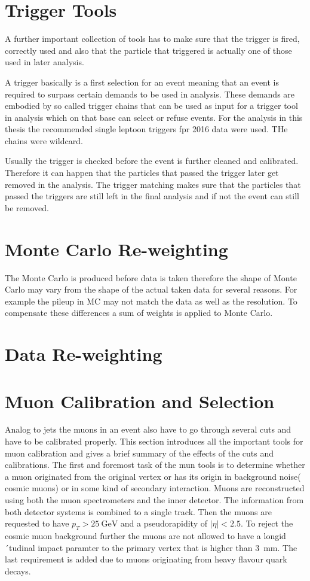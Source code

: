 \section{Trigger Tools}

A further important collection of tools has to make sure that the trigger is fired, correctly used and also that the particle that triggered is actually one of those used in later analysis.

A trigger basically is a first selection for an event meaning that an event is required to surpass certain demands to be used in analysis. These demands are embodied by so called trigger chains that can be used as input for a trigger tool in analysis which on that base can select or refuse events. For the analysis in this thesis the recommended single leptoon triggers fpr 2016 data were used. THe chains were wildcard.

Usually the trigger is checked before the event is further cleaned and calibrated. Therefore it can happen that the particles that passed the trigger later get removed in the analysis. The trigger matching makes sure that the particles that passed the triggers are still left in the final analysis and if not the event can still be removed.

\section{Monte Carlo Re-weighting}

The Monte Carlo is produced before data is taken therefore the shape of Monte Carlo may vary from the shape of the actual taken data for several reasons. For example the pileup in MC may not match the data as well as the resolution. To compensate these differences a sum of weights is applied to Monte Carlo.

\section{Data Re-weighting}

\section{Muon Calibration and Selection}

Analog to jets the muons in an event also have to go through several cuts and have to be calibrated properly. This section introduces all the important tools for muon calibration and gives a brief summary of the effects of the cuts and calibrations.
The first and foremost task of the mun tools is to determine whether a muon originated from the original vertex or has its origin in background noise( cosmic muons) or in some kind of secondary interaction. Muons are reconstructed using both the muon spectrometers and the inner detector. The information from both detector systems is combined to a single track. Then the muons are requested to have $p_T > \SI{25}{\GeV}$ and a pseudorapidity of $|\eta| < \num{2.5}$. To reject the cosmic muon background further the muons are not allowed to have a longid´tudinal impact paramter to the primary vertex that is higher than \SI{3}{\mm}. The last requirement is added due to muons originating from heavy flavour quark decays. 

